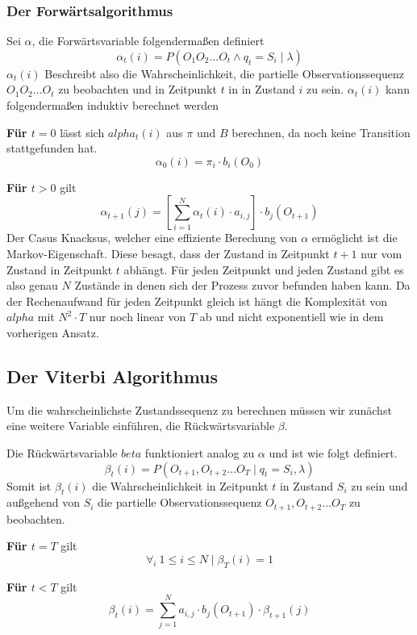 \subsubsection*{Der Forwärtsalgorithmus}
Sei $\alpha$, die Forwärtsvariable folgendermaßen definiert
\begin{equation*}
    \alpha_t(i) = P(O_1 O_2 \dots O_t \wedge q_t = S_i \mid \lambda)
\end{equation*}
$\alpha_t(i)$ Beschreibt also die Wahrscheinlichkeit, die partielle Observationssequenz $O_1 O_2 \dots O_t$ zu beobachten und in Zeitpunkt $t$ in in Zustand $i$ zu sein. $\alpha_t(i)$ kann folgendermaßen induktiv berechnet werden

\textbf{Für $t=0$} lässt sich $alpha_t(i)$ aus $\pi$ und $B$ berechnen, da noch keine Transition stattgefunden hat. 
\begin{equation*}
    \alpha_0(i) = \pi_i \cdot b_i(O_0)
\end{equation*}

\textbf{Für $t>0$} gilt
\begin{equation*}
    \alpha_{t+1}(j) = \left[ \sum_{i=1}^{N} \alpha_t(i) \cdot a_{i,j} \right] \cdot b_j(O_{t+1})
\end{equation*}
Der Casus Knacksus, welcher eine effiziente Berechung von $\alpha$ ermöglicht ist die Markov-Eigenschaft.
Diese besagt, dass der Zustand in Zeitpunkt $t+1$ nur vom Zustand in Zeitpunkt $t$ abhängt.
Für jeden Zeitpunkt und jeden Zustand gibt es also genau $N$ Zustände in denen sich
der Prozess zuvor befunden haben kann. Da der Rechenaufwand für jeden Zeitpunkt gleich ist hängt die Komplexität von
$alpha$ mit $N^2 \cdot T$ nur noch linear von $T$ ab und nicht exponentiell wie in dem vorherigen Ansatz.

\subsection{Der Viterbi Algorithmus}
Um die wahrscheinlichste Zustandssequenz zu berechnen müssen wir zunächst eine weitere Variable einführen, die Rückwärtsvariable $\beta$.
\begin{definition}
    Die Rückwärtsvariable $beta$ funktioniert analog zu $\alpha$ und ist wie folgt definiert.
    \begin{equation*}
        \beta_t(i) = P(O_{t+1}, O_{t+2} \dots O_T \mid q_t = S_i, \lambda)
    \end{equation*}
    Somit ist $\beta_t(i)$ die Wahrscheinlichkeit in Zeitpunkt $t$ in Zustand $S_i$ zu sein und außgehend von $S_i$ die partielle Observationssequenz $O_{t+1}, O_{t+2} \dots O_T$ zu beobachten.

    \textbf{Für $t = T$} gilt
    \begin{equation*}
        \forall_i \  1 \leq i \leq N \mid \beta_T(i) = 1  
    \end{equation*}

    \textbf{Für $t < T$} gilt
    \begin{equation*}
        \beta_t(i) = \sum_{j=1}^{N} a_{i,j} \cdot b_j(O_{t+1}) \cdot \beta_{t+1}(j)
    \end{equation*}
\end{definition}

